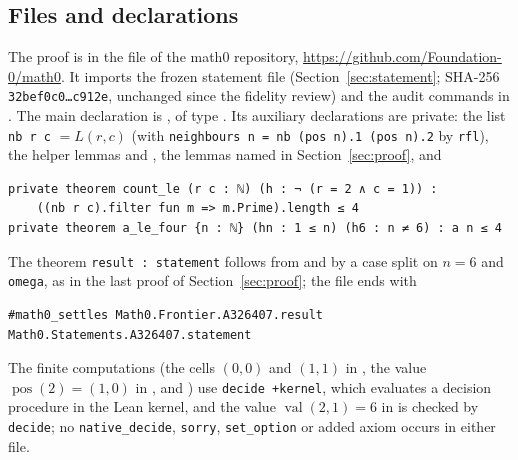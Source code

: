 \documentclass[11pt]{amsart}
\theoremstyle{plain}
\theoremstyle{definition}
\newcommand{\val}{\operatorname{val}}
\newcommand{\pos}{\operatorname{pos}}
\begin{document}
\subsection*{Files and declarations}
The proof is in the file  of the math0 repository, \url{https://github.com/Foundation-0/math0}.
It imports the frozen statement file  (Section~\ref{sec:statement}; SHA-256 \texttt{32bef0c0\ldots c912e}, unchanged since the fidelity review) and the audit commands in .
The main declaration is , of type .
Its auxiliary declarations are private: the list \texttt{nb r c} $=L(r,c)$ (with \texttt{neighbours n = nb (pos n).1 (pos n).2} by \texttt{rfl}), the helper lemmas  and , the lemmas named in Section~\ref{sec:proof}, and
\begin{lstlisting}
private theorem count_le (r c : ℕ) (h : ¬ (r = 2 ∧ c = 1)) :
    ((nb r c).filter fun m => m.Prime).length ≤ 4
private theorem a_le_four {n : ℕ} (hn : 1 ≤ n) (h6 : n ≠ 6) : a n ≤ 4
\end{lstlisting}
The theorem \texttt{result : statement} follows from  and  by a case split on $n=6$ and \texttt{omega}, as in the last proof of Section~\ref{sec:proof}; the file ends with
\begin{lstlisting}
#math0_settles Math0.Frontier.A326407.result Math0.Statements.A326407.statement
\end{lstlisting}
The finite computations (the cells $(0,0)$ and $(1,1)$ in , the value $\pos(2)=(1,0)$ in , and ) use \texttt{decide +kernel}, which evaluates a decision procedure in the Lean kernel, and the value $\val(2,1)=6$ in  is checked by \texttt{decide}; no \texttt{native\_decide}, \texttt{sorry}, \texttt{set\_option} or added axiom occurs in either file.
\end{document}
